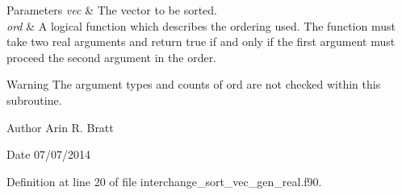 \begin{DoxyParams}{Parameters}
{\em vec} & The vector to be sorted.\\
\hline
{\em ord} & A logical function which describes the ordering used. The function must take two real arguments and return true if and only if the first argument must proceed the second argument in the order.\\
\hline
\end{DoxyParams}
\begin{DoxyWarning}{Warning}
The argument types and counts of ord are not checked within this subroutine.
\end{DoxyWarning}
\begin{DoxyAuthor}{Author}
Arin R. Bratt 
\end{DoxyAuthor}
\begin{DoxyDate}{Date}
07/07/2014 
\end{DoxyDate}


Definition at line 20 of file interchange\-\_\-sort\-\_\-vec\-\_\-gen\-\_\-real.\-f90.


